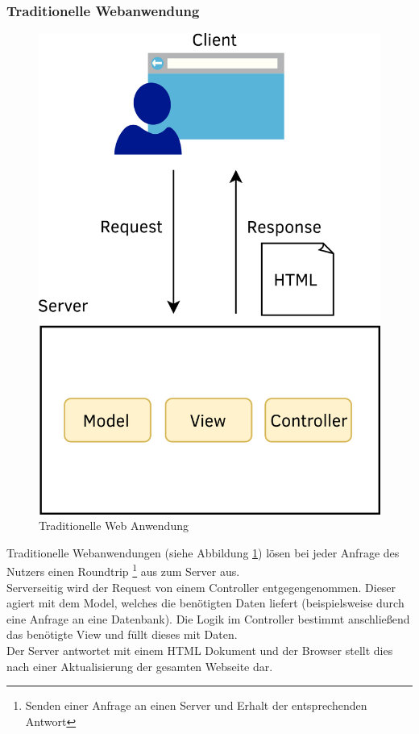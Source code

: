 \subsubsection{Traditionelle Webanwendung}
\begin{figure}
  \begin{center}
    \includegraphics[scale=1]{images/traditonal_web_app.png}
  \end{center}
  \caption{Traditionelle Web Anwendung}
  \label{fig:tradweb}
\end{figure}
Traditionelle Webanwendungen (siehe Abbildung \ref{fig:tradweb}) lösen bei jeder Anfrage des Nutzers einen Roundtrip \footnote{Senden einer Anfrage an einen Server und Erhalt der entsprechenden Antwort} aus zum Server aus.\\
Serverseitig wird der Request von einem Controller entgegengenommen. Dieser agiert mit dem Model, welches die benötigten Daten liefert (beispielsweise durch eine Anfrage an eine Datenbank). Die Logik im Controller bestimmt anschließend das benötigte View und füllt dieses mit Daten.\\
Der Server antwortet mit einem \ac{HTML} Dokument und der Browser stellt dies nach einer Aktualisierung der gesamten Webseite dar.
